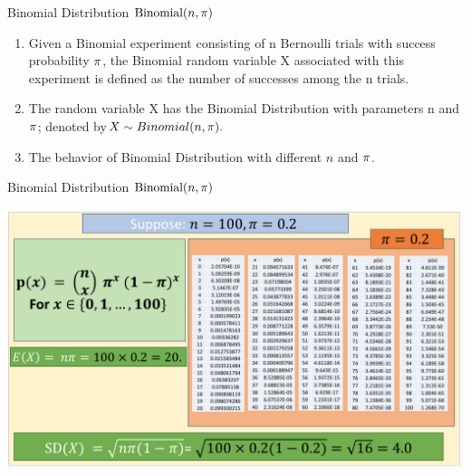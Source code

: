 \documentclass[compress]{beamer}
\begin{document}

\begin{frame}{Binomial Distribution $\text{Binomial}(n,\pi)$}
\begin{enumerate}
\item Given a Binomial experiment consisting of n Bernoulli trials with
success probability $\pi$, the Binomial random variable X associated
with this experiment is defined as the number of successes among the
n trials.
\item The random variable X has the Binomial Distribution with
parameters n and $\pi$; denoted by$ X\sim Binomial(n, \pi).$

\item The behavior of Binomial Distribution with different $n$ and $\pi$.

\end{enumerate}

\end{frame}




\begin{frame}{Binomial Distribution $\text{Binomial}(n,\pi)$}
\vspace{-.1in}
\vspace{.1in}

\end{frame}



\begin{frame}
\vspace{-.1in}
\begin{center}
\includegraphics[scale=.45]{figs/BinomialExpectedValue.png}
\end{center}
\vspace{1in}
\end{frame}
\end{document}
